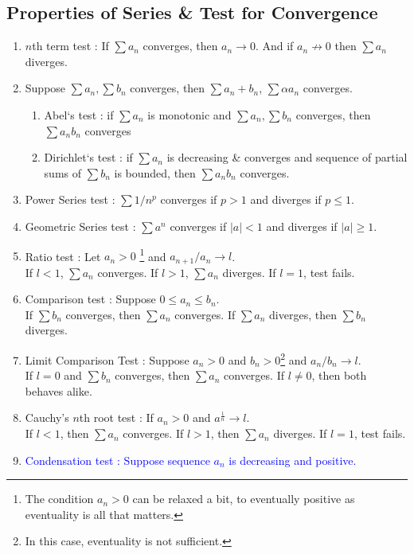 \subsection{Properties of Series \& Test for Convergence}
\begin{enumerate}
	\item $n$th term test : If $\sum a_n$ converges, then $a_n \to 0$. And if $a_n \not\to 0$ then $\sum a_n$ diverges.
	\item Suppose $\sum a_n, \sum b_n$ converges, then $\sum a_n+b_n$, $\sum \alpha a_n$ converges.
		\begin{enumerate}
			\item Abel`s test : if $\sum a_n$ is monotonic and $\sum a_n,\sum b_n$ converges, then $\sum a_nb_n$ converges
			\item Dirichlet`s test : if $\sum a_n$ is decreasing \& converges and sequence of partial sums of $\sum b_n$ is bounded, then $\sum a_nb_n$ converges.
		\end{enumerate}
	\item Power Series test : $\sum 1/n^p$ converges if $p>1$ and diverges if $p \le 1$.
	\item Geometric Series test : $\sum a^n$ converges if $|a| < 1$ and diverges if $|a| \ge 1$.
	\item Ratio test : Let $a_n > 0$ \footnote{The condition $a_n > 0$ can be relaxed a bit, to eventually positive as eventuality is all that matters.} and $a_{n+1}/a_n \to l$.\\
		If $l<1$, $\sum a_n$ converges. If $l>1$, $\sum a_n$ diverges. If $l = 1$, test fails.
	\item Comparison test : Suppose $0 \le a_n \le b_n$.\\
		If $\sum b_n$ converges, then $\sum a_n$ converges. If $\sum a_n$ diverges, then $\sum b_n$ diverges.
	\item { \color{red}Limit Comparison Test : Suppose $a_n > 0$ and $b_n > 0$\footnote{In this case, eventuality is not sufficient.} and $a_n/b_n \to l$.\\
		If $l = 0$ and $\sum b_n$ converges, then $\sum a_n$ converges.
		If $l \ne 0$, then both behaves alike.}
	\item Cauchy's $n$th root test : If $a_n > 0$ and $a^\frac{1}{n} \to l$.\\
		If $l < 1$, then $\sum a_n$ converges. If $l > 1$, then $\sum a_n$ diverges. If $l = 1$, test fails.
	\item \textcolor{blue}{Condensation test : Suppose sequence $a_n$ is decreasing and positive.\\
}
\end{enumerate}
